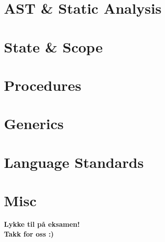 \section{AST \& Static Analysis}


\section{State \& Scope}


\section{Procedures}


\section{Generics}


\section{Language Standards}


\section{Misc}



\begin{frame}
\begin{center}
\begin{Large}
\textbf{Lykke til på eksamen!\\[5mm]
Takk for oss :)}

\end{Large}
\end{center}  
\end{frame}
